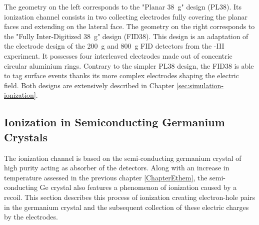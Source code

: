 The geometry on the left corresponds to the "Planar \SI{38}{\g}" design (PL38). Its ionization channel consists in two collecting electrodes fully covering the planar faces and extending on the lateral face.
The geometry on the right corresponds to the "Fully Inter-Digitized \SI{38}{\g}" design (FID38). This design is an adaptation of the electrode design of the \SI{200}{\g} and \SI{800}{\g} FID detectors from the \Edelweiss{}-III experiment. It possesses four interleaved electrodes made out of concentric circular aluminium rings. Contrary to the simpler PL38 design, the FID38 is able to tag surface events thanks its more complex electrodes shaping the electric field. Both designs are extensively described in Chapter \ref{sec:simulation-ionization}.


\subsection{Ionization in Semiconducting Germanium Crystals}
\label{par:ionization-process}



The ionization channel is based on the semi-conducting germanium crystal of high purity acting as absorber of the detectors. Along with an increase in temperature assessed in the previous chapter \ref{ChapterEthem}, the semi-conducting Ge crystal also features a phenomenon of ionization caused by a recoil. This section describes this process of ionization creating electron-hole pairs in the germanium crystal and the subsequent collection of these electric charges by the electrodes.

